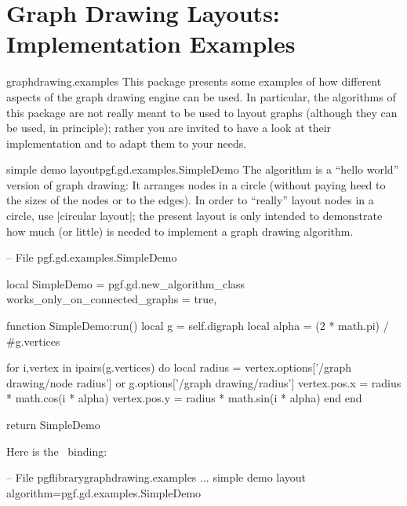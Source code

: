 %
%
%

\section{Graph Drawing Layouts: Implementation Examples}


\begin{tikzlibrary}{graphdrawing.examples}
  This package presents some examples of how different aspects of the
  graph drawing engine can be used. In particular, the algorithms of
  this package are not really meant to be used to layout graphs
  (although they can be used, in principle); rather you are invited to
  have a look at their implementation and to adapt them to your
  needs. 
\end{tikzlibrary}


\begin{gdalgorithm}{simple demo layout}{pgf.gd.examples.SimpleDemo}
  The algorithm is a ``hello world'' version of graph drawing: It
  arranges nodes in a circle (without paying heed to the sizes of the
  nodes or to the edges). In order to ``really'' layout nodes in a
  circle, use |circular layout|; the present layout is only intended
  to demonstrate how much (or little) is needed to implement a graph
  drawing algorithm.
\begin{codeexample}
-- File pgf.gd.examples.SimpleDemo

local SimpleDemo = pgf.gd.new_algorithm_class {
  works_only_on_connected_graphs = true,
}

function SimpleDemo:run()
  local g = self.digraph
  local alpha = (2 * math.pi) / #g.vertices

  for i,vertex in ipairs(g.vertices) do
    local radius = vertex.options['/graph drawing/node radius'] or g.options['/graph drawing/radius']
    vertex.pos.x = radius * math.cos(i * alpha)
    vertex.pos.y = radius * math.sin(i * alpha)
  end
end

return SimpleDemo
\end{codeexample}
Here is the \tikzname\ binding:
\begin{codeexample}
-- File pgflibrarygraphdrawing.examples
...  
                         {simple demo layout}
                         {algorithm=pgf.gd.examples.SimpleDemo}
\end{codeexample}

\end{gdalgorithm}


